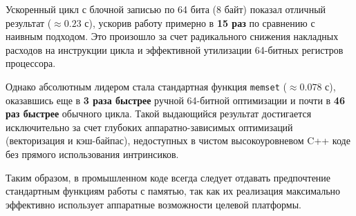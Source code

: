 \documentclass[12pt, a4paper]{article}
\theoremstyle{definition}
\begin{document}
Ускоренный цикл с блочной записью по 64 бита ($8$ байт) показал отличный результат ($\approx 0.23$ с), ускорив работу примерно в \textbf{15 раз} по сравнению с наивным подходом. Это произошло за счет радикального снижения накладных расходов на инструкции цикла и эффективной утилизации 64-битных регистров процессора.

Однако абсолютным лидером стала стандартная функция \texttt{memset} ($\approx 0.078$ с), оказавшись еще в \textbf{3 раза быстрее} ручной 64-битной оптимизации и почти в \textbf{46 раз быстрее} обычного цикла. Такой выдающийся результат достигается исключительно за счет глубоких аппаратно-зависимых оптимизаций (векторизация и кэш-байпас), недоступных в чистом высокоуровневом C++ коде без прямого использования интринсиков.

Таким образом, в промышленном коде всегда следует отдавать предпочтение стандартным функциям работы с памятью, так как их реализация максимально эффективно использует аппаратные возможности целевой платформы.
\end{document}
